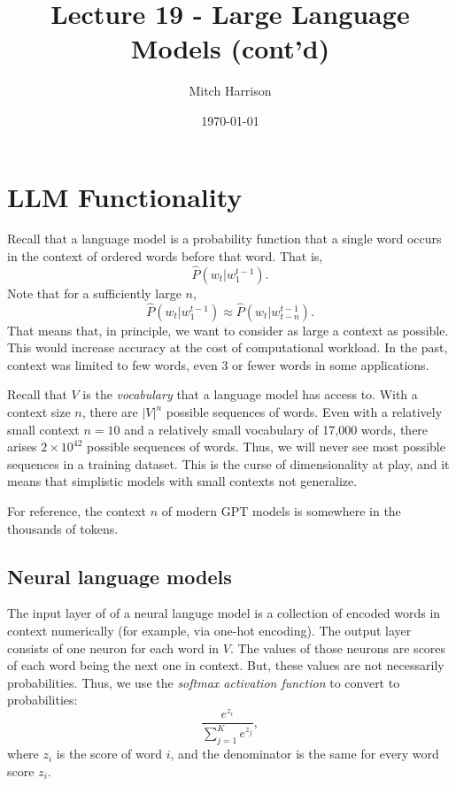 \documentclass[titlepage, 12pt, leqno]{article}
\title{\Huge{Lecture 19 - Large Language Models (cont'd)}}
\author{\large{Mitch Harrison}}
\date{\today}
\begin{document}
\setlength{\parskip}{1\baselineskip}
\setlength{\parindent}{15pt}
\maketitle
\tableofcontents
\newpage


\section{LLM Functionality}

Recall that a language model is a probability function that a single word
occurs in the context of ordered words before that word. That is,
\[
\hat P(w_{t}|w_{1}^{t-1}).
\]
Note that for a sufficiently large $n$,
\[
\hat P(w_{t}|w_{1}^{t-1}) \approx\hat P(w_{t}|w_{t-n}^{t-1}) .
\]
That means that, in principle, we want to consider as large a context as 
possible. This would increase accuracy at the cost of computational workload.
In the past, context was limited to few words, even 3 or fewer words in some
applications.

Recall that $V$ is the \textit{vocabulary} that a language model has access to.
With a context size $n$, there are $|V|^{n}$ possible sequences of words. Even
with a relatively small context $n=10$ and a relatively small vocabulary of
17,000 words, there arises $2\times 10^{42}$ possible sequences of words. Thus,
we will never see most possible sequences in a training dataset. This is the
curse of dimensionality at play, and it means that simplistic models with small
contexts not generalize. 
\begin{note}
    For reference, the context $n$ of modern GPT models is somewhere in the
    thousands of tokens.
\end{note}

\subsection{Neural language models}
The input layer of of a neural languge model is a collection of encoded words
in context numerically (for example, via one-hot encoding). The output layer
consists of one neuron for each word in $V$. The values of those neurons are
scores of each word being the next one in context. But, these values are not
necessarily probabilities. Thus, we use the \textit{softmax activation function}
to convert to probabilities:
\[
\frac{e^{z_{i}}}{\sum_{j=1}^{K}e^{z_{j}}},
\]
where $z_{i}$ is the score of word $i$, and the denominator is the same for
every word score $z_{i}$.
\end{document}
